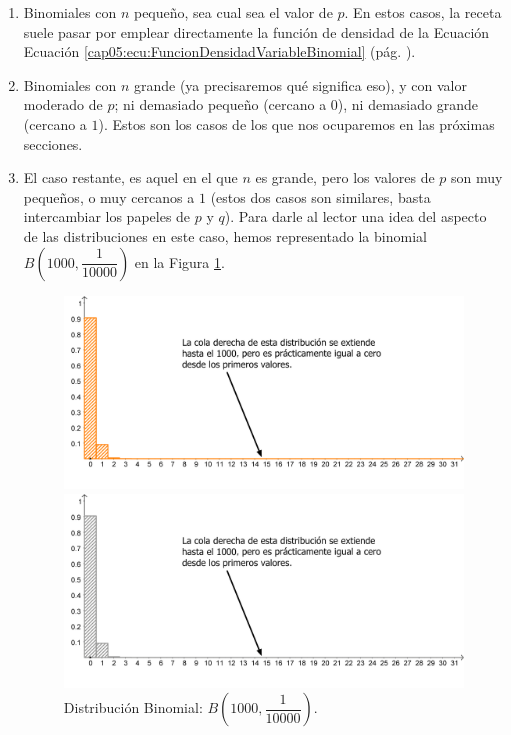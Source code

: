 \begin{enumerate}
  \item Binomiales con $n$ pequeño, sea cual sea el valor de $p$. En estos casos, la receta suele
      pasar por emplear directamente la función de densidad de la Ecuación Ecuación
      \ref{cap05:ecu:FuncionDensidadVariableBinomial} (pág.
      \pageref{cap05:ecu:FuncionDensidadVariableBinomial}).
  \item Binomiales con $n$ grande (ya precisaremos qué significa eso), y con valor moderado de
      $p$; ni demasiado pequeño (cercano a $0$), ni demasiado grande (cercano a $1$). Estos son
      los casos de los que nos ocuparemos en las próximas secciones.
  \item El caso restante, es aquel en el que $n$ es grande, pero los valores de $p$ son muy
      pequeños, o muy cercanos a $1$ (estos dos casos son similares, basta intercambiar los
      papeles de $p$ y $q$). Para darle al lector una idea del aspecto de las distribuciones en
      este caso, hemos representado la binomial $B(1000,\dfrac{1}{10000})$ en la Figura
      \ref{cap01:fig:ZooBinomial04}.

  \begin{figure}[hbt]
	\begin{center}
	\begin{enColor}
	\includegraphics[width=11.5cm]{../fig/Cap05-ZooBinomial04.png}
	\end{enColor}
	\begin{bn}
	\includegraphics[width=11.5cm]{../fig/Cap05-ZooBinomial04-bn.png}
	\end{bn}
	\caption{Distribución Binomial: $B\left(1000,\dfrac{1}{10000}\right)$.}
	\label{cap01:fig:ZooBinomial04}
    \end{center}
  \end{figure}



\end{enumerate}
